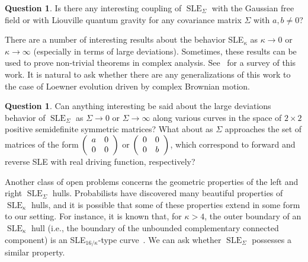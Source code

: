 \documentclass[11pt]{article}
\theoremstyle{plain}
\theoremstyle{definition}
\newtheorem{ques}[thm]{Question}
\numberwithin{equation}{section}
\newcommand{\rta}{\rightarrow}
\newcommand{\SLE}{{\operatorname{SLE}}_\kappa}
\newcommand{\SLEG}{{\operatorname{SLE}}_\Sigma}
\newcommand{\ccM}{{\mathbf{c}_{\mathrm M}}}
\let\originalleft\left
\let\originalright\right
\renewcommand{\left}{\mathopen{}\mathclose\bgroup\originalleft}
\renewcommand{\right}{\aftergroup\egroup\originalright}
\begin{document}
\begin{ques}
Is there any interesting coupling of $\SLEG$ with the Gaussian free field or with Liouville quantum gravity for any covariance matrix $\Sigma$ with $a,b \neq 0$?  %
\end{ques}

 

There are a number of interesting results about the behavior SLE$_\kappa$ as $\kappa \rta 0$ or $\kappa \rta \infty$ (especially in terms of large deviations). Sometimes, these results can be used to prove non-trivial theorems in complex analysis. See~\cite{wang-ld-survey} for a survey of this work. It is natural to ask whether there are any generalizations of this work to the case of Loewner evolution driven by complex Brownian motion. 

\begin{ques}
Can anything interesting be said about the large deviations behavior of $\SLEG$ as $\Sigma \rta 0$ or $\Sigma\rta\infty$ along various curves in the space of $2\times 2$ positive semidefinite symmetric matrices? What about as $\Sigma$ approaches the set of matrices of the form $\left(\begin{array}{cc}
a & 0 \\ 
0 & 0
\end{array} \right)$ or $\left(\begin{array}{cc}
0 & 0 \\ 
0 & b
\end{array} \right)$, 
which correspond to forward and reverse SLE with real driving function, respectively?
\end{ques}





Another class of open problems concerns the geometric properties of the left and right $\SLEG$ hulls. Probabilists have discovered many beautiful properties of $\SLE$ hulls, and it is possible that some of these properties extend in some form to our setting. For instance, it is known that, for $\kappa>4$, the outer boundary of an $\SLE$ hull (i.e., the boundary of the unbounded complementary connected component) is an SLE$_{16/\kappa}$-type curve~\cite{zhan-duality1,zhan-duality2,dubedat-duality,ig1,ig4}. We can ask whether $\SLEG$ possesses a similar property.
\end{document}
